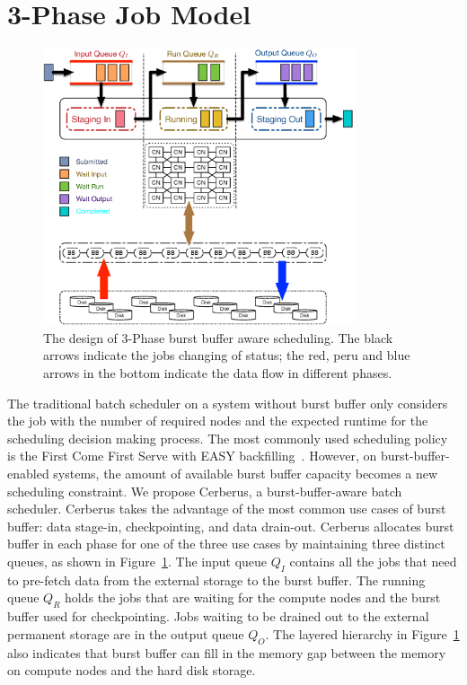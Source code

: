 \section{3-Phase Job Model}
\label{Sec:Model}

\begin{figure}[htp]
        \centering
        \includegraphics[width=3.6in]{CerberusBBSystem}
        \caption{The design of 3-Phase burst buffer aware scheduling. The black arrows indicate 
        the jobs changing of status; the red, peru and blue arrows in the bottom indicate the data flow in different phases.}
        \label{Fig:CerberusQueues}
\end{figure}

The traditional batch scheduler on a system without burst buffer only considers
the job with the number of required nodes and the expected runtime for the scheduling decision making process.
The most commonly used scheduling policy is the First Come First Serve with EASY backfilling~\cite{tsafrir-tpds-2007}.
However, on burst-buffer-enabled systems,
the amount of available burst buffer capacity becomes a new scheduling constraint.
We propose Cerberus, a burst-buffer-aware batch scheduler.
Cerberus takes the advantage of the most common use cases of burst buffer:
data stage-in, checkpointing, and data drain-out.
Cerberus allocates burst buffer in each phase for one of the three use cases
by maintaining three distinct queues, as shown in Figure~\ref{Fig:CerberusQueues}.
The input queue $Q_I$ contains all the jobs that need to pre-fetch data from the external storage to the burst buffer.
The running queue $Q_R$ holds the jobs that are waiting for the compute nodes and the burst buffer used for checkpointing.
Jobs waiting to be drained out to the external permanent storage are in the output queue $Q_O$.
The layered hierarchy in Figure~\ref{Fig:CerberusQueues} also indicates that burst buffer
can fill in the memory gap between the memory on compute nodes and the hard disk storage.


